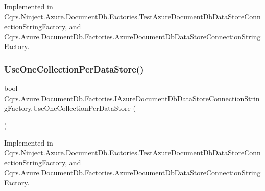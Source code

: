 Implemented in \hyperlink{classCqrs_1_1Ninject_1_1Azure_1_1DocumentDb_1_1Factories_1_1TestAzureDocumentDbDataStoreConnectionStringFactory_ab4b864396b790819609d3337dfb3f75d}{Cqrs.\+Ninject.\+Azure.\+Document\+Db.\+Factories.\+Test\+Azure\+Document\+Db\+Data\+Store\+Connection\+String\+Factory}, and \hyperlink{classCqrs_1_1Azure_1_1DocumentDb_1_1Factories_1_1AzureDocumentDbDataStoreConnectionStringFactory_a2a30d6066e2bc9c4af078b1f0a5407ab}{Cqrs.\+Azure.\+Document\+Db.\+Factories.\+Azure\+Document\+Db\+Data\+Store\+Connection\+String\+Factory}.

\mbox{\label{interfaceCqrs_1_1Azure_1_1DocumentDb_1_1Factories_1_1IAzureDocumentDbDataStoreConnectionStringFactory_afdb9a4c6d4ada68c58413909d65e3d1c}} 
\subsubsection{\texorpdfstring{Use\+One\+Collection\+Per\+Data\+Store()}{UseOneCollectionPerDataStore()}}
{\footnotesize\ttfamily bool Cqrs.\+Azure.\+Document\+Db.\+Factories.\+I\+Azure\+Document\+Db\+Data\+Store\+Connection\+String\+Factory.\+Use\+One\+Collection\+Per\+Data\+Store (\begin{DoxyParamCaption}{ }\end{DoxyParamCaption})}



Implemented in \hyperlink{classCqrs_1_1Ninject_1_1Azure_1_1DocumentDb_1_1Factories_1_1TestAzureDocumentDbDataStoreConnectionStringFactory_a3f802b2e647584bb96fdcdb532a149bb}{Cqrs.\+Ninject.\+Azure.\+Document\+Db.\+Factories.\+Test\+Azure\+Document\+Db\+Data\+Store\+Connection\+String\+Factory}, and \hyperlink{classCqrs_1_1Azure_1_1DocumentDb_1_1Factories_1_1AzureDocumentDbDataStoreConnectionStringFactory_a736e0967785b1391ec21989a3f005c01}{Cqrs.\+Azure.\+Document\+Db.\+Factories.\+Azure\+Document\+Db\+Data\+Store\+Connection\+String\+Factory}.

